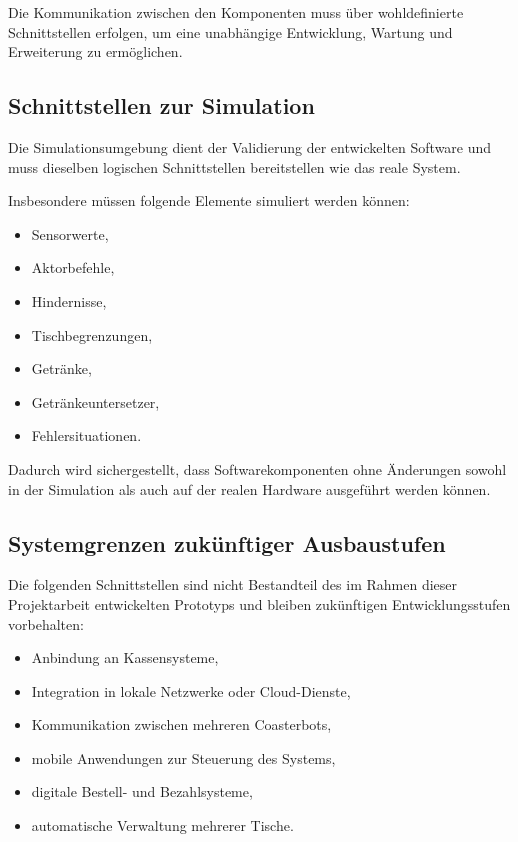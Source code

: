 Die Kommunikation zwischen den Komponenten muss über wohldefinierte
Schnittstellen erfolgen, um eine unabhängige Entwicklung, Wartung und
Erweiterung zu ermöglichen.

\subsection{Schnittstellen zur
Simulation}\label{schnittstellen-zur-simulation}

Die Simulationsumgebung dient der Validierung der entwickelten Software
und muss dieselben logischen Schnittstellen bereitstellen wie das reale
System.

Insbesondere müssen folgende Elemente simuliert werden können:

\begin{itemize}
\tightlist
\item
  Sensorwerte,
\item
  Aktorbefehle,
\item
  Hindernisse,
\item
  Tischbegrenzungen,
\item
  Getränke,
\item
  Getränkeuntersetzer,
\item
  Fehlersituationen.
\end{itemize}

Dadurch wird sichergestellt, dass Softwarekomponenten ohne Änderungen
sowohl in der Simulation als auch auf der realen Hardware ausgeführt
werden können.

\subsection{Systemgrenzen zukünftiger
Ausbaustufen}\label{systemgrenzen-zukuxfcnftiger-ausbaustufen}

Die folgenden Schnittstellen sind nicht Bestandteil des im Rahmen dieser
Projektarbeit entwickelten Prototyps und bleiben zukünftigen
Entwicklungsstufen vorbehalten:

\begin{itemize}
\tightlist
\item
  Anbindung an Kassensysteme,
\item
  Integration in lokale Netzwerke oder Cloud-Dienste,
\item
  Kommunikation zwischen mehreren Coasterbots,
\item
  mobile Anwendungen zur Steuerung des Systems,
\item
  digitale Bestell- und Bezahlsysteme,
\item
  automatische Verwaltung mehrerer Tische.
\end{itemize}

